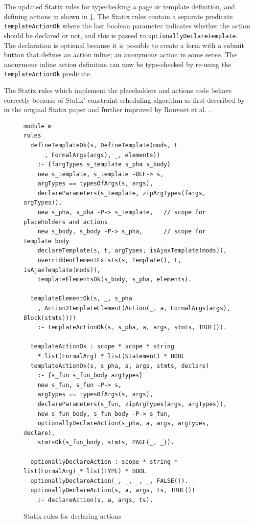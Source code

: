     The updated Statix rules for typechecking a page or template definition, and defining actions in shown in \cref{fig:actions-placeholders-statix}. The Statix rules contain a separate predicate \texttt{templateActionOk} where the last boolean parameter indicates whether the action should be declared or not, and this is passed to \texttt{optionallyDeclareTemplate}. The declaration is optional because it is possible to create a form with a submit button that defines an action inline; an anonymous action in some sense. The anonymous inline action definition can now be type-checked by re-using the \texttt{templateActionOk} predicate.

    The Statix rules which implement the placeholders and actions code behave correctly because of Statix' constraint scheduling algorithm as first described by in the original Statix paper \autocite{VanAntwerpen2018} and further improved by Rouvoet et al. \autocite{RouvoetAPKV20}.

    \begin{figure}
      \begin{verbatim}
module m
rules
  defineTemplateOk(s, DefineTemplate(mods, t
      , FormalArgs(args), _, elements))
    :- {fargTypes s_template s_pha s_body}
    new s_template, s_template -DEF-> s,
    argTypes == typesOfArgs(s, args),
    declareParameters(s_template, zipArgTypes(fargs, argTypes)),
    new s_pha, s_pha -P-> s_template,   // scope for placeholders and actions
    new s_body, s_body -P-> s_pha,      // scope for template body
    declareTemplate(s, t, argTypes, isAjaxTemplate(mods)),
    overriddenElementExists(s, Template(), t, isAjaxTemplate(mods)),
    templateElementsOk(s_body, s_pha, elements).

  templateElementOk(s, _, s_pha
    , Action2TemplateElement(Action(_, a, FormalArgs(args), Block(stmts))))
    :- templateActionOk(s, s_pha, a, args, stmts, TRUE()).

  templateActionOk : scope * scope * string
    * list(FormalArg) * list(Statement) * BOOL
  templateActionOk(s, s_pha, a, args, stmts, declare)
    :- {s_fun s_fun_body argTypes}
    new s_fun, s_fun -P-> s,
    argTypes == typesOfArgs(s, args),
    declareParameters(s_fun, zipArgTypes(args, argTypes)),
    new s_fun_body, s_fun_body -P-> s_fun,
    optionallyDeclareAction(s_pha, a, args, argTypes, declare),
    stmtsOk(s_fun_body, stmts, PAGE(_, _)).

  optionallyDeclareAction : scope * string * list(FormalArg) * list(TYPE) * BOOL
  optionallyDeclareAction(_, _, _, _, FALSE()).
  optionallyDeclareAction(s, a, args, ts, TRUE())
    :- declareAction(s, a, args, ts).
      \end{verbatim}
      \caption{\label{fig:actions-placeholders-statix}Statix rules for declaring actions}
    \end{figure}

